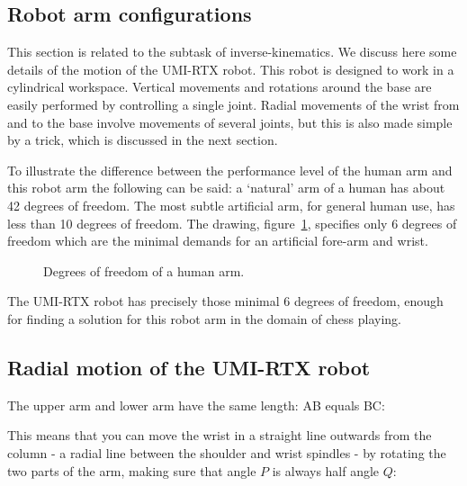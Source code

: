 \documentclass[10pt]{scrartcl}
\begin{document}
\subsection{Robot arm configurations}

This section is related to the subtask of inverse-kinematics. We discuss
here some details of the motion of the UMI-RTX robot. This robot is
designed to work in a cylindrical workspace. Vertical movements and
rotations around the base are easily performed by controlling a single
joint. Radial movements of the wrist from and to the base involve
movements of several joints, but this is also made simple by a trick,
which is discussed in the next section.

To illustrate the difference between the performance level of the human
arm and this robot arm the following can be said: a `natural' arm of a
human has about 42 degrees of freedom. The most subtle artificial arm, for
general human use, has less than 10 degrees of freedom. The drawing,
figure~\ref{fig:hand}, specifies only 6 degrees of freedom which are the minimal
demands for an artificial fore-arm and wrist.
                    
\begin{figure}[htbp] 
  \centerline{}
  \caption{Degrees of freedom of a human arm.} 
  \label{fig:hand}
\end{figure}      

The UMI-RTX robot has precisely those minimal 6 degrees of freedom,
enough for finding a solution for this robot arm in the domain of chess
playing.

\subsection{Radial motion of the UMI-RTX robot}

The upper arm and lower arm have the same length: AB equals BC: %
                                   
\begin{figure}[htp]
  \centerline{}
  \label{fig:arm1}
\end{figure}

This means that you can move the wrist in a straight line outwards from
the column - a radial line between the shoulder and wrist spindles - by
rotating the two parts of the arm, making sure that angle $P$ is always
half angle $Q$: %
\end{document}
